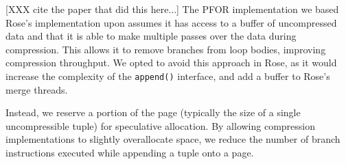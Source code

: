\documentclass{vldb}
\newcommand{\rows}{Rose\xspace}
\newcommand{\rowss}{Rose's\xspace}
\begin{document}
[XXX cite the paper that did this here...] The PFOR implementation
we based \rowss implementation upon assumes it has access to
a buffer of uncompressed data and that it is able to make multiple
passes over the data during compression.  This allows it to remove
branches from loop bodies, improving compression throughput.  We opted
to avoid this approach in \rows, as it would increase the complexity
of the {\tt append()} interface, and add a buffer to \rowss merge threads.

Instead, we reserve a portion of the page (typically the size of a
single uncompressible tuple) for speculative allocation.  By allowing
compression implementations to slightly overallocate space, we reduce
the number of branch instructions executed while appending a tuple
onto a page.




\end{document}
